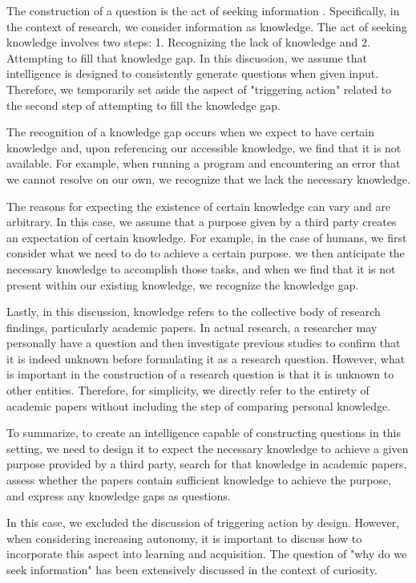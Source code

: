 \documentclass{book}
\begin{document}
The construction of a question is the act of seeking information \cite{watson2015ask}. Specifically, in the context of research, we consider information as knowledge. The act of seeking knowledge involves two steps: 1. Recognizing the lack of knowledge and 2. Attempting to fill that knowledge gap. In this discussion, we assume that intelligence is designed to consistently generate questions when given input. Therefore, we temporarily set aside the aspect of "triggering action" related to the second step of attempting to fill the knowledge gap.

The recognition of a knowledge gap occurs when we expect to have certain knowledge and, upon referencing our accessible knowledge, we find that it is not available. For example, when running a program and encountering an error that we cannot resolve on our own, we recognize that we lack the necessary knowledge.

The reasons for expecting the existence of certain knowledge can vary and are arbitrary. In this case, we assume that a purpose given by a third party creates an expectation of certain knowledge. For example, in the case of humans, we first consider what we need to do to achieve a certain purpose. we then anticipate the necessary knowledge to accomplish those tasks, and when we find that it is not present within our existing knowledge, we recognize the knowledge gap.

Lastly, in this discussion, knowledge refers to the collective body of research findings, particularly academic papers. In actual research, a researcher may personally have a question and then investigate previous studies to confirm that it is indeed unknown before formulating it as a research question. However, what is important in the construction of a research question is that it is unknown to other entities. Therefore, for simplicity, we directly refer to the entirety of academic papers without including the step of comparing personal knowledge.

To summarize, to create an intelligence capable of constructing questions in this setting, we need to design it to expect the necessary knowledge to achieve a given purpose provided by a third party, search for that knowledge in academic papers, assess whether the papers contain sufficient knowledge to achieve the purpose, and express any knowledge gaps as questions.

In this case, we excluded the discussion of triggering action by design. However, when considering increasing autonomy, it is important to discuss how to incorporate this aspect into learning and acquisition. The question of "why do we seek information" has been extensively discussed in the context of curiosity.
\end{document}
